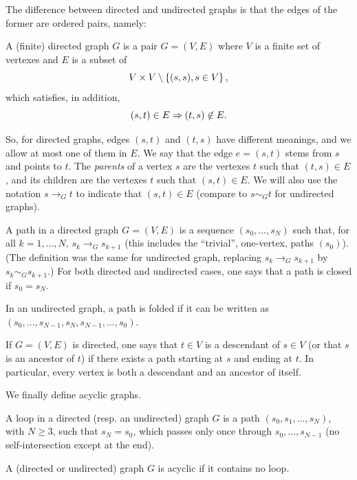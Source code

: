 The difference between directed and undirected graphs is that the
edges of
the former are ordered pairs, namely:
\begin{definition}
\label{def:dir.grph}
A (finite) directed graph $G$ is a pair $G=(V,E)$ where $V$ is a
finite set of vertexes and $E$ is a subset of 
\[V\times V \setminus
\left\{ (s,s), s\in V \right\},
\]
which satisfies, in addition,
\[
(s,t)\in E\Rightarrow (t,s)\not\in E.
\]
\end{definition}
So, for directed graphs, edges $(s,t)$ and $(t,s)$ have different meanings, and we allow at most one of them in $E$. We say that the edge $e=(s,t)$ stems from $s$ and points
to $t$. The {\em parents} of a vertex $s$ are the vertexes $t$ such
that $(t,s)\in E$, and its children are the vertexes $t$ such that
$(s,t)\in E$. We will also use the notation $s\to_G t$ to indicate that $(s,t)
\in E$ (compare to $s\sim_G t$ for undirected graphs).

\begin{definition}
\label{def:path.dir}
A path
in a directed graph $G=(V,E)$ is a sequence $(s_0, \ldots, s_N)$ such that, for
all $k=1, \ldots, N$, $s_k\to_G  s_{k+1}$ (this includes the ``trivial'', one-vertex, paths $(s_0)$). 
(The definition was the same for undirected graph, replacing  $s_k\to_G  s_{k+1}$ by  $s_k\sim_G  s_{k+1}$.) 
For both directed and undirected cases, one says that a path is closed if $s_0 = s_N$.

In an undirected graph, a path is folded if it can be written as $(s_0, \ldots, s_{N-1}, s_N, s_{N-1}, \ldots, s_0)$. 

If $G=(V,E)$ is directed, one says that $t\in V$ is a descendant of $s\in V$ (or that $s$ is an ancestor of $t$) if there exists a path starting at $s$ and ending at $t$. In particular, every vertex is both a descendant and an ancestor of itself.
\end{definition}

We finally define acyclic graphs.
\begin{definition}
\label{def:acyc}
A loop in a  directed (resp. an undirected) graph $G$ is a  path $(s_0, s_1,
\ldots, s_{N})$, with $N\geq 3$,  such that $s_{N} = s_0$, which passes only once through $s_0, \ldots,
s_{N-1}$ (no self-intersection except at the end).

A (directed or  undirected) graph $G$ is acyclic if it contains no
loop.
\end{definition}

